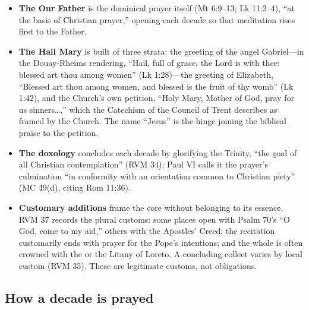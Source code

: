 \begin{itemize}
\item \textbf{The Our Father} is the dominical prayer itself (Mt
6:9--13; Lk 11:2--4), ``at the basis of Christian prayer,'' opening each
decade so that meditation rises first to the Father.
\item \textbf{The Hail Mary} is built of three strata: the greeting of
the angel Gabriel---in the Douay-Rheims rendering, ``Hail, full of
grace, the Lord is with thee: blessed art thou among women'' (Lk
1:28)---the greeting of Elizabeth, ``Blessed art thou among women, and
blessed is the fruit of thy womb'' (Lk 1:42), and the Church's own
petition, ``Holy Mary, Mother of God, pray for us sinners\ldots,''
which the Catechism of the Council of Trent describes as framed by the
Church. The name ``Jesus'' is the hinge joining the biblical praise to
the petition.
\item \textbf{The doxology} concludes each decade by glorifying the
Trinity, ``the goal of all Christian contemplation'' (RVM 34); Paul VI
calls it the prayer's culmination ``in conformity with an orientation
common to Christian piety'' (MC 49(d), citing Rom 11:36).
\item \textbf{Customary additions} frame the core without belonging to
its essence. RVM 37 records the plural customs: some places open with
Psalm 70's ``O God, come to my aid,'' others with the Apostles' Creed;
the recitation customarily ends with prayer for the Pope's intentions;
and the whole is often crowned with the  or the
Litany of Loreto. A concluding collect varies by local custom (RVM
35). These are legitimate customs, not obligations.
\end{itemize}

\subsection{How a decade is prayed}

